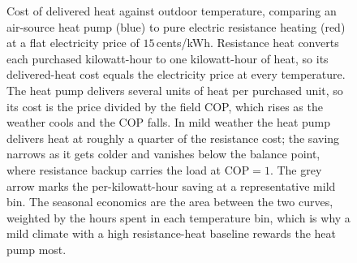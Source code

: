 \begin{figure}[htbp]
\centering
{}
\caption[Heat-pump versus resistance heating cost]{Cost of delivered heat
against outdoor temperature, comparing an air-source heat pump (blue) to pure
electric resistance heating (red) at a flat electricity price of
$15\,$cents/kWh. Resistance heat converts each purchased kilowatt-hour to one
kilowatt-hour of heat, so its delivered-heat cost equals the electricity price
at every temperature. The heat pump delivers several units of heat per
purchased unit, so its cost is the price divided by the field COP, which rises
as the weather cools and the COP falls. In mild weather the heat pump delivers
heat at roughly a quarter of the resistance cost; the saving narrows as it gets
colder and vanishes below the balance point, where resistance backup carries
the load at $\text{COP}=1$. The grey arrow marks the per-kilowatt-hour saving
at a representative mild bin. The seasonal economics are the area between the
two curves, weighted by the hours spent in each temperature bin, which is why a
mild climate with a high resistance-heat baseline rewards the heat pump most.}
\label{fig:vol04ch03:heat-pump-seasonal-cost}
\end{figure}
